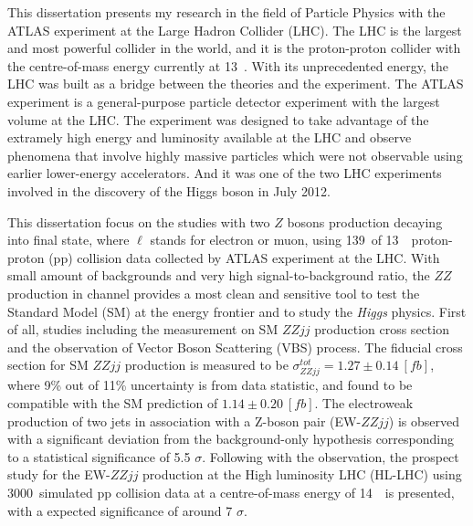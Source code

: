 \begin{enabstract}
This dissertation presents my research in the field of Particle Physics with the ATLAS experiment at the Large Hadron Collider (LHC). 
The LHC is the largest and most powerful collider in the world, and it is the proton-proton collider with the centre-of-mass energy currently at 13~\tev.
With its unprecedented energy, the LHC was built as a bridge between the theories and the experiment.
The ATLAS experiment is a general-purpose particle detector experiment with the largest volume at the LHC.
The experiment was designed to take advantage of the extramely high energy and luminosity available at the LHC 
and observe phenomena that involve highly massive particles which were not observable using earlier lower-energy accelerators.
And it was one of the two LHC experiments involved in the discovery of the Higgs boson in July 2012.

This dissertation focus on the studies with two $Z$ bosons production decaying into \llll final state, where $\ell$ stands for electron or muon, using 139~\ifb of 13~\tev~proton-proton (pp) collision data collected by ATLAS experiment at the LHC.
With small amount of backgrounds and very high signal-to-background ratio, the $ZZ$ production in \llll channel provides a most clean and sensitive tool to test the Standard Model (SM) at the energy frontier and to study the \textit{Higgs} physics.
First of all, studies including the measurement on SM $ZZjj$ production cross section and the observation of Vector Boson Scattering (VBS) process.
The fiducial cross section for SM $ZZjj$ production is measured to be $\sigma_{ZZjj}^{tot} = 1.27 \pm 0.14~[fb]$, 
where 9\% out of 11\% uncertainty is from data statistic, and found to be compatible with the SM prediction of $1.14 \pm 0.20~[fb]$.
The electroweak production of two jets in association with a Z-boson pair (EW-$ZZjj$) is observed with
a significant deviation from the background-only hypothesis corresponding to a statistical significance of 5.5 $\sigma$.
Following with the observation, the prospect study for the EW-$ZZjj$ production at the High luminosity LHC (HL-LHC) using 3000~\ifb simulated pp collision data at a centre-of-mass energy of 14~\tev~is presented,
with a expected significance of around 7 $\sigma$.


\end{enabstract}
